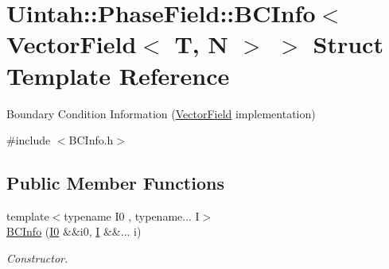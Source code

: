 \hypertarget{structUintah_1_1PhaseField_1_1BCInfo_3_01VectorField_3_01T_00_01N_01_4_01_4}{}\section{Uintah\+:\+:Phase\+Field\+:\+:B\+C\+Info$<$ Vector\+Field$<$ T, N $>$ $>$ Struct Template Reference}
\label{structUintah_1_1PhaseField_1_1BCInfo_3_01VectorField_3_01T_00_01N_01_4_01_4}


Boundary Condition Information (\hyperlink{structUintah_1_1PhaseField_1_1VectorField}{Vector\+Field} implementation)  




{\ttfamily \#include $<$B\+C\+Info.\+h$>$}

\subsection*{Public Member Functions}
\begin{DoxyCompactItemize}
\item 
{\footnotesize template$<$typename I0 , typename... I$>$ }\\\hyperlink{structUintah_1_1PhaseField_1_1BCInfo_3_01VectorField_3_01T_00_01N_01_4_01_4_a90e4e750e4c44c0a04aeb5ea2f81b565}{B\+C\+Info} (\hyperlink{namespaceUintah_1_1PhaseField_a547ce3002aa97fbd3ef3192a6eec8406abdd8ebcbdfd71d1125937e3012dc45fb}{I0} \&\&i0, \hyperlink{structUintah_1_1PhaseField_1_1I}{I} \&\&... i)
\begin{DoxyCompactList}\small\item\em Constructor. \end{DoxyCompactList}\end{DoxyCompactItemize}
